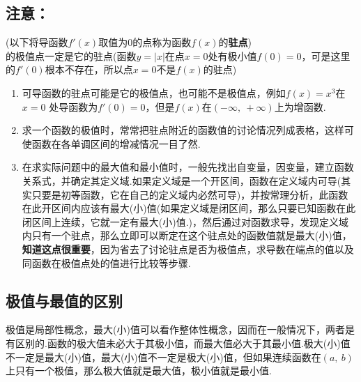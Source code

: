 {\subsection{注意：}
(以下将导函数$ f'(x) $取值为0的点称为函数$f(x)$的\textbf{驻点})\\
的极值点一定是它的驻点(函数$ y=\left|x\right| $在点$ x=0 $处有极小值$ f(0)=0 $，可是这里的$ f'(0) $根本不存在，所以点$ x=0 $不是$f(x)$的驻点)\\
\begin{enumerate}
\item 可导函数的驻点可能是它的极值点，也可能不是极值点，例如$ f(x)=x^3$在$ x=0 $ 处导函数为$ f'(0)=0 $，但是$ f(x) $在$ (-\infty,~+\infty) $上为增函数.
\item 求一个函数的极值时，常常把驻点附近的函数值的讨论情况列成表格，这样可使函数在各单调区间的增减情况一目了然.
\item 在求实际问题中的最大值和最小值时，一般先找出自变量，因变量，建立函数关系式，并确定其定义域.如果定义域是一个开区间，函数在定义域内可导(其实只要是初等函数，它在自己的定义域内必然可导)，并按常理分析，此函数在此开区间内应该有最大(小)值(如果定义域是闭区间，那么只要已知函数在此闭区间上连续，它就一定有最大(小)值.)，然后通过对函数求导，发现定义域内只有一个驻点，那么立即可以断定在这个驻点处的函数值就是最大(小)值，\textbf{知道这点很重要}，因为省去了讨论驻点是否为极值点，求导数在端点的值以及同函数在极值点处的值进行比较等步骤.
\end{enumerate}
\subsection{极值与最值的区别}

极值是局部性概念，最大(小)值可以看作整体性概念，因而在一般情况下，两者是有区别的.函数的极大值未必大于其极小值，而最大值必大于其最小值.极大(小)值不一定是最大(小)值，最大(小)值不一定是极大(小)值，但如果连续函数在$ (a,~b) $上只有一个极值，那么极大值就是最大值，极小值就是最小值.







}
